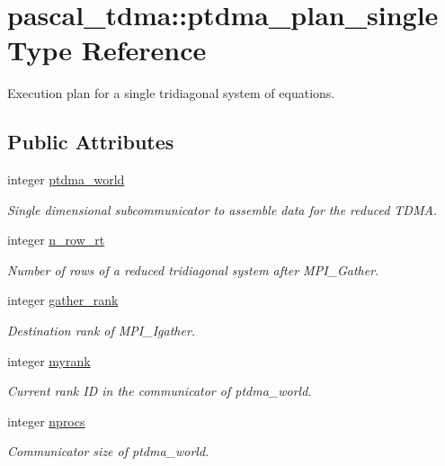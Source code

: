 \hypertarget{structpascal__tdma_1_1ptdma__plan__single}{}\section{pascal\+\_\+tdma\+:\+:ptdma\+\_\+plan\+\_\+single Type Reference}
\label{structpascal__tdma_1_1ptdma__plan__single}


Execution plan for a single tridiagonal system of equations.  


\subsection*{Public Attributes}
\begin{DoxyCompactItemize}
\item 
integer \hyperlink{structpascal__tdma_1_1ptdma__plan__single_a073cddefd8ef983b185b6727d8ad7de6}{ptdma\+\_\+world}
\begin{DoxyCompactList}\small\item\em Single dimensional subcommunicator to assemble data for the reduced T\+D\+MA. \end{DoxyCompactList}\item 
integer \hyperlink{structpascal__tdma_1_1ptdma__plan__single_a91fd8fb919f9b7d3137b13fcaa55dc1b}{n\+\_\+row\+\_\+rt}
\begin{DoxyCompactList}\small\item\em Number of rows of a reduced tridiagonal system after M\+P\+I\+\_\+\+Gather. \end{DoxyCompactList}\item 
integer \hyperlink{structpascal__tdma_1_1ptdma__plan__single_af0d3b3bce8b9956aa9e80ba0712a9a9d}{gather\+\_\+rank}
\begin{DoxyCompactList}\small\item\em Destination rank of M\+P\+I\+\_\+\+Igather. \end{DoxyCompactList}\item 
integer \hyperlink{structpascal__tdma_1_1ptdma__plan__single_af473533b36508af4e0752cee8d182334}{myrank}
\begin{DoxyCompactList}\small\item\em Current rank ID in the communicator of ptdma\+\_\+world. \end{DoxyCompactList}\item 
integer \hyperlink{structpascal__tdma_1_1ptdma__plan__single_ad37699922fd3eb9c8ef7c42a60583dc7}{nprocs}
\begin{DoxyCompactList}\small\item\em Communicator size of ptdma\+\_\+world. \end{DoxyCompactList}\end{DoxyCompactItemize}
